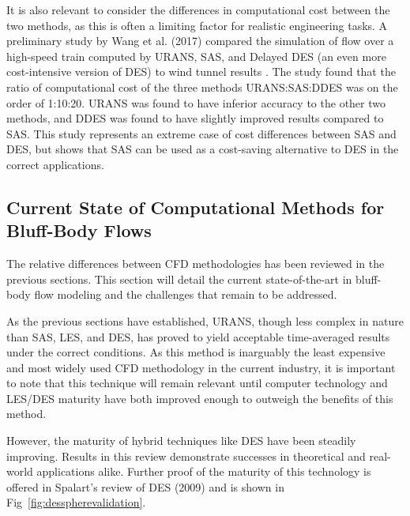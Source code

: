 \documentclass[journal]{new-aiaa}
\begin{document}
It is also relevant to consider the differences in computational cost between the two methods, as this is often a limiting factor for realistic engineering tasks. A preliminary study by Wang et al. (2017) compared the simulation of flow over a high-speed train computed by URANS, SAS, and Delayed DES (an even more cost-intensive version of DES) to wind tunnel results \cite{wang2017performance}. The study found that the ratio of computational cost of the three methods URANS:SAS:DDES was on the order of 1:10:20. URANS was found to have inferior accuracy to the other two methods, and DDES was found to have slightly improved results compared to SAS. This study represents an extreme case of cost differences between SAS and DES, but shows that SAS can be used as a cost-saving alternative to DES in the correct applications.
















\subsection{Current State of Computational Methods for Bluff-Body Flows} \label{subsec:currentstatenumeric}


The relative differences between CFD methodologies has been reviewed in the previous sections. This section will detail the current state-of-the-art in bluff-body flow modeling and the challenges that remain to be addressed.

As the previous sections have established, URANS, though less complex in nature than SAS, LES, and DES, has proved to yield acceptable time-averaged results under the correct conditions. As this method is inarguably the least expensive and most widely used CFD methodology in the current industry, it is important to note that this technique will remain relevant until computer technology and LES/DES maturity have both improved enough to outweigh the benefits of this method.

However, the maturity of hybrid techniques like DES have been steadily improving.  Results in this review demonstrate successes in theoretical and real-world applications alike. Further proof of the maturity of this technology is offered in Spalart's review of DES (2009) \cite{spalart2009detachededdy} and is shown in Fig~\ref{fig:desspherevalidation}.
\end{document}
